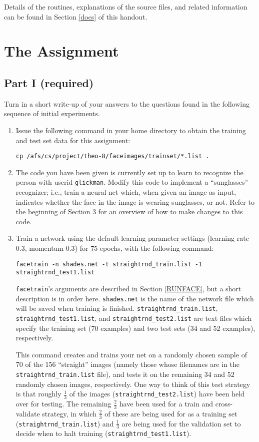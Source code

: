 Details of the routines, explanations of the source files, and related
information can be found in Section \ref{docs} of this handout.

\section{The Assignment}

\subsection{Part I (required)}

Turn in a short write-up of your answers to the questions found in the
following sequence of initial experiments.

\begin{enumerate}

\item Issue the following command in your home directory to obtain
the training and test set data for this assignment:

{\tt cp /afs/cs/project/theo-8/faceimages/trainset/*.list .}

\item The code you have been given is currently set up to learn to recognize
the person with userid {\tt glickman}.  Modify this code to implement a
``sunglasses'' recognizer; i.e., train a neural net which, when given an image
as input, indicates whether the face in the image is wearing sunglasses, or
not. Refer to the beginning of Section 3 for an overview of how to
make changes to this code.

\item Train a network using the default learning parameter settings (learning
rate 0.3, momentum 0.3) for 75 epochs, with the following command:

{\tt facetrain -n shades.net -t straightrnd\_train.list -1 straightrnd\_test1.list}

{\tt facetrain}'s arguments are described in Section \ref{RUNFACE},
but a short description is in order here.  {\tt shades.net} is the name of
the network file which will be saved when training is finished.
{\tt straightrnd\_train.list}, {\tt straightrnd\_test1.list}, and
{\tt straightrnd\_test2.list} are text files which specify the training
set (70 examples) and two test sets (34 and 52 examples), respectively.

This command creates and trains your net on a randomly chosen sample
of 70 of the 156 ``straight'' images (namely those whose filenames are
in the {\tt straightrnd\_train.list} file), and tests it on the
remaining 34 and 52 randomly chosen images, respectively.  One way to
think of this test strategy is that roughly $\frac{1}{3}$ of the
images ({\tt straightrnd\_test2.list}) have been held over for
testing.  The remaining $\frac{2}{3}$ have been used for a train and
cross-validate strategy, in which $\frac{2}{3}$ of these are being
used for as a training set ({\tt straightrnd\_train.list}) and
$\frac{1}{3}$ are being used for the validation set to decide when to
halt training ({\tt straightrnd\_test1.list}).


\end{enumerate}
